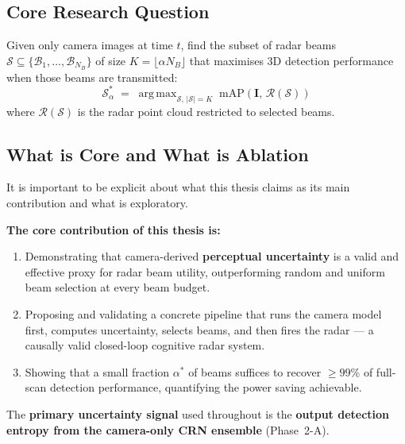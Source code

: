 \documentclass[12pt, a4paper]{article}
\DeclareMathOperator*{\argmax}{arg\,max}
\newcommand{\beam}{\mathcal{B}}
\newcommand{\beamset}{\mathcal{S}}
\theoremstyle{definition}
\begin{document}
\subsection{Core Research Question}

Given only camera images at time $t$, find the subset of radar beams
$\beamset \subseteq \{\beam_1,\ldots,\beam_{N_B}\}$ of size $K = \lfloor\alpha N_B\rfloor$
that maximises 3D detection performance when those beams are transmitted:
\begin{equation}
  \beamset^*_\alpha
  \;=\;
  \argmax_{\beamset,\,|\beamset|=K}
  \;\mathrm{mAP}\!\left(\mathbf{I},\,\mathcal{R}(\beamset)\right)
  \label{eq:problem}
\end{equation}
where $\mathcal{R}(\beamset)$ is the radar point cloud restricted to selected beams.

\subsection{What is Core and What is Ablation}
\label{sec:core_vs_ablation}

It is important to be explicit about what this thesis claims as its main
contribution and what is exploratory.

\begin{corebox}
\textbf{The core contribution of this thesis is:}
\begin{enumerate}
  \item Demonstrating that camera-derived \textbf{perceptual uncertainty} is a
        valid and effective proxy for radar beam utility, outperforming
        random and uniform beam selection at every beam budget.
  \item Proposing and validating a concrete pipeline that runs the camera model
        first, computes uncertainty, selects beams, and then fires the radar ---
        a causally valid closed-loop cognitive radar system.
  \item Showing that a small fraction $\alpha^*$ of beams suffices to recover
        $\geq 99\%$ of full-scan detection performance, quantifying the
        power saving achievable.
\end{enumerate}
The \textbf{primary uncertainty signal} used throughout is the \textbf{output
detection entropy from the camera-only CRN ensemble} (Phase~2-A).
\end{corebox}
\end{document}
